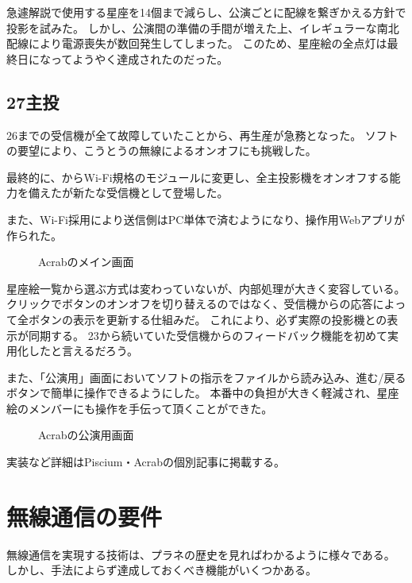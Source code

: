 \documentclass[letterpaper,10pt,dvipdfmx]{sphinxmanual}
\begin{document}
急遽解説で使用する星座を14個まで減らし、公演ごとに配線を繋ぎかえる方針で投影を試みた。
しかし、公演間の準備の手間が増えた上、イレギュラーな南北配線により電源喪失が数回発生してしまった。
このため、星座絵の全点灯は最終日になってようやく達成されたのだった。


\subsection{27主投}
\label{\detokenize{wireless/wireless:id10}}
26までの受信機が全て故障していたことから、再生産が急務となった。
ソフトの要望により、こうとうの無線によるオンオフにも挑戦した。

最終的に、からWi-Fi規格のモジュールに変更し、全主投影機をオンオフする能力を備えたが新たな受信機として登場した。

また、Wi-Fi採用により送信側はPC単体で済むようになり、操作用Webアプリが作られた。
\begin{figure}[htbp]
\centering
\capstart

\noindent{}
\caption{Acrabのメイン画面}\label{\detokenize{wireless/wireless:id21}}\end{figure}

星座絵一覧から選ぶ方式は変わっていないが、内部処理が大きく変容している。
クリックでボタンのオンオフを切り替えるのではなく、受信機からの応答によって全ボタンの表示を更新する仕組みだ。
これにより、必ず実際の投影機との表示が同期する。
23から続いていた受信機からのフィードバック機能を初めて実用化したと言えるだろう。

また、「公演用」画面においてソフトの指示をファイルから読み込み、進む/戻るボタンで簡単に操作できるようにした。
本番中の負担が大きく軽減され、星座絵のメンバーにも操作を手伝って頂くことができた。
\begin{figure}[htbp]
\centering
\capstart

\noindent{}
\caption{Acrabの公演用画面}\label{\detokenize{wireless/wireless:id22}}\end{figure}

実装など詳細はPiscium・Acrabの個別記事に掲載する。


\section{無線通信の要件}
\label{\detokenize{wireless/wireless:id11}}
無線通信を実現する技術は、プラネの歴史を見ればわかるように様々である。
しかし、手法によらず達成しておくべき機能がいくつかある。
\end{document}
